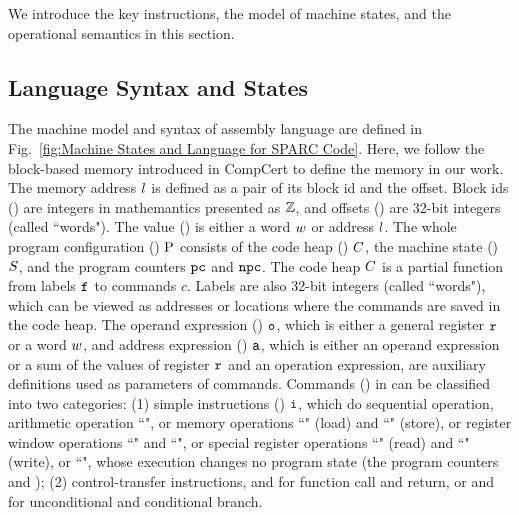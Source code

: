 We introduce the key \sparc{} instructions, the model of machine
states, and the operational semantics in this section.

\subsection{Language Syntax and States}
\label{subsec:syntax}

The machine model and syntax of \sparc{} assembly language
are defined in Fig.~\ref{fig:Machine States and Language for SPARC Code}.
Here, we follow the block-based memory \cite{CompCertMM} introduced
in CompCert to define the memory in our work.
The memory address $l$ is defined as a pair of
its block id and the offset. Block ids
() are integers
in mathemantics presented as $\mathbb{Z}$, 
and offsets ()
are 32-bit integers (called ``words").
The value ()
is either a word $w$ or address $l$.
The whole program configuration ()
$\text{P}$ consists of the code heap ()
$C$, the machine state () $S$, 
and the program counters $\texttt{pc}$ and $\texttt{npc}$.
The code heap $C$ is a partial function
from labels $\texttt{f}_{}$ to commands $c$.
Labels are also 32-bit integers (called ``words"),
which can be viewed as addresses or locations
where the commands are saved in the code heap.
The operand expression ()
$\texttt{o}$, which is either a general
register $\texttt{r}_{}$ or a word $w$,
and address expression () $\texttt{a}$,
which is either an operand expression or a
sum of the values of register $\texttt{r}_{}$ and an operation
expression, are auxiliary definitions used as parameters of commands.
Commands () in \sparc{} can be classified into two categories:
(1) simple instructions ()
$\texttt{i}{}$, which do sequential
operation, \eg{} arithmetic operation ``\cadd{}",
or memory operations
``\ld{}" (load) and ``\st{}" (store), or register window
operations ``\csave{}" and ``\crestore{}", or special
register operations ``\rd{}" (read) and ``\cwr{}" (write), 
or ``\nop{}", whose execution changes no program state
(the program counters \pc{} and \npc{});
(2) control-transfer instructions,
\eg{} \call{} and \retl{} for
function call and return, or \jmp{} and \be{} for
unconditional and conditional branch.

